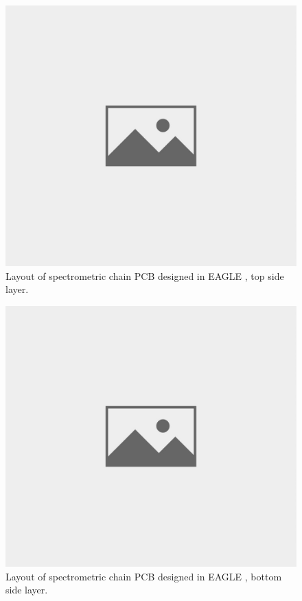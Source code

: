 \begin{figure}[H]
 \centering
 \includegraphics[scale=0.35, angle = 0]{./pictures/NoPicture.jpg}
 \caption{Layout of spectrometric chain PCB designed in EAGLE \cite{eagle}, top side layer.}
 \label{layout top}
 
\end{figure}

\begin{figure}[H]
 \centering
 \includegraphics[scale=0.35, angle = 0]{./pictures/NoPicture.jpg}
 \caption{Layout of spectrometric chain PCB designed in EAGLE \cite{eagle}, bottom side layer.}
 \label{layout bottom}
 
\end{figure}

